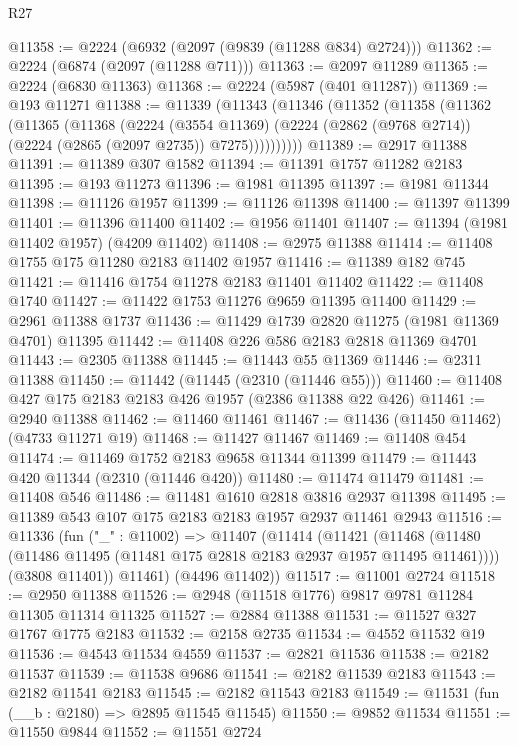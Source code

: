 \begin{lexlean}{R27}
\begin{coremodule}
@11358 := @2224 (@6932 (@2097 (@9839 (@11288 @834) @2724)))
@11362 := @2224 (@6874 (@2097 (@11288 @711)))
@11363 := @2097 @11289
@11365 := @2224 (@6830 @11363)
@11368 := @2224 (@5987 (@401 @11287))
@11369 := @193 @11271
@11388 := @11339
    (@11343
      (@11346
        (@11352
          (@11358
            (@11362
              (@11365
                (@11368
                  (@2224
                    (@3554 @11369)
                    (@2224 (@2862 (@9768 @2714)) (@2224 (@2865 (@2097 @2735)) @7275))))))))))
@11389 := @2917 @11388
@11391 := @11389 @307 @1582
@11394 := @11391 @1757 @11282 @2183
@11395 := @193 @11273
@11396 := @1981 @11395
@11397 := @1981 @11344
@11398 := @11126 @1957
@11399 := @11126 @11398
@11400 := @11397 @11399
@11401 := @11396 @11400
@11402 := @1956 @11401
@11407 := @11394 (@1981 @11402 @1957) (@4209 @11402)
@11408 := @2975 @11388
@11414 := @11408 @1755 @175 @11280 @2183 @11402 @1957
@11416 := @11389 @182 @745
@11421 := @11416 @1754 @11278 @2183 @11401 @11402
@11422 := @11408 @1740
@11427 := @11422 @1753 @11276 @9659 @11395 @11400
@11429 := @2961 @11388 @1737
@11436 := @11429 @1739 @2820 @11275 (@1981 @11369 @4701) @11395
@11442 := @11408 @226 @586 @2183 @2818 @11369 @4701
@11443 := @2305 @11388
@11445 := @11443 @55 @11369
@11446 := @2311 @11388
@11450 := @11442 (@11445 (@2310 (@11446 @55)))
@11460 := @11408 @427 @175 @2183 @2183 @426 @1957 (@2386 @11388 @22 @426)
@11461 := @2940 @11388
@11462 := @11460 @11461
@11467 := @11436 (@11450 @11462) (@4733 @11271 @19)
@11468 := @11427 @11467
@11469 := @11408 @454
@11474 := @11469 @1752 @2183 @9658 @11344 @11399
@11479 := @11443 @420 @11344 (@2310 (@11446 @420))
@11480 := @11474 @11479
@11481 := @11408 @546
@11486 := @11481 @1610 @2818 @3816 @2937 @11398
@11495 := @11389 @543 @107 @175 @2183 @2183 @1957 @2937 @11461 @2943
@11516 := @11336
    (fun ("_" : @11002) =>
    @11407
      (@11414
        (@11421
          (@11468 (@11480 (@11486 @11495 (@11481 @175 @2818 @2183 @2937 @1957 @11495 @11461))))
          (@3808 @11401))
        @11461)
      (@4496 @11402))
@11517 := @11001 @2724
@11518 := @2950 @11388
@11526 := @2948 (@11518 @1776) @9817 @9781 @11284 @11305 @11314 @11325
@11527 := @2884 @11388
@11531 := @11527 @327 @1767 @1775 @2183
@11532 := @2158 @2735
@11534 := @4552 @11532 @19
@11536 := @4543 @11534 @4559
@11537 := @2821 @11536
@11538 := @2182 @11537
@11539 := @11538 @9686
@11541 := @2182 @11539 @2183
@11543 := @2182 @11541 @2183
@11545 := @2182 @11543 @2183
@11549 := @11531 (fun (__b : @2180) => @2895 @11545 @11545)
@11550 := @9852 @11534
@11551 := @11550 @9844
@11552 := @11551 @2724

\end{coremodule}
\end{lexlean}
